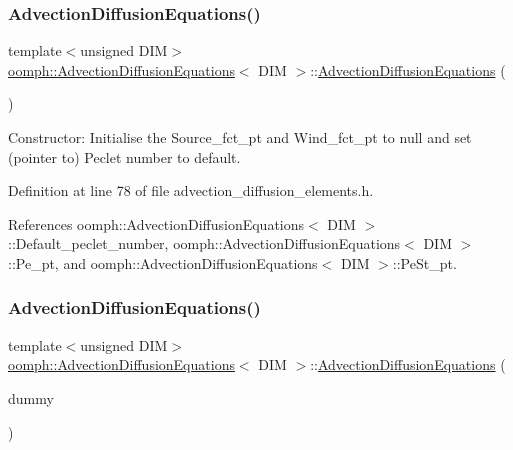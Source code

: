 \subsubsection{\texorpdfstring{Advection\+Diffusion\+Equations()}{AdvectionDiffusionEquations()}\hspace{0.1cm}{\footnotesize\ttfamily [1/2]}}
{\footnotesize\ttfamily template$<$unsigned D\+IM$>$ \\
\hyperlink{classoomph_1_1AdvectionDiffusionEquations}{oomph\+::\+Advection\+Diffusion\+Equations}$<$ D\+IM $>$\+::\hyperlink{classoomph_1_1AdvectionDiffusionEquations}{Advection\+Diffusion\+Equations} (\begin{DoxyParamCaption}{ }\end{DoxyParamCaption})\hspace{0.3cm}{\ttfamily [inline]}}



Constructor\+: Initialise the Source\+\_\+fct\+\_\+pt and Wind\+\_\+fct\+\_\+pt to null and set (pointer to) Peclet number to default. 



Definition at line 78 of file advection\+\_\+diffusion\+\_\+elements.\+h.



References oomph\+::\+Advection\+Diffusion\+Equations$<$ D\+I\+M $>$\+::\+Default\+\_\+peclet\+\_\+number, oomph\+::\+Advection\+Diffusion\+Equations$<$ D\+I\+M $>$\+::\+Pe\+\_\+pt, and oomph\+::\+Advection\+Diffusion\+Equations$<$ D\+I\+M $>$\+::\+Pe\+St\+\_\+pt.

\mbox{\label{classoomph_1_1AdvectionDiffusionEquations_aad53e287ed605e9f1080a94d3b351ab7}} 
\subsubsection{\texorpdfstring{Advection\+Diffusion\+Equations()}{AdvectionDiffusionEquations()}\hspace{0.1cm}{\footnotesize\ttfamily [2/2]}}
{\footnotesize\ttfamily template$<$unsigned D\+IM$>$ \\
\hyperlink{classoomph_1_1AdvectionDiffusionEquations}{oomph\+::\+Advection\+Diffusion\+Equations}$<$ D\+IM $>$\+::\hyperlink{classoomph_1_1AdvectionDiffusionEquations}{Advection\+Diffusion\+Equations} (\begin{DoxyParamCaption}\item[{const \hyperlink{classoomph_1_1AdvectionDiffusionEquations}{Advection\+Diffusion\+Equations}$<$ D\+IM $>$ \&}]{dummy }\end{DoxyParamCaption})\hspace{0.3cm}{\ttfamily [inline]}}



